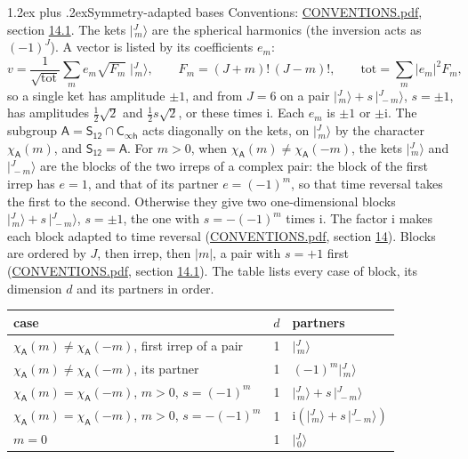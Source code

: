 \documentclass[10pt,a4paper]{article}
\makeatletter
\renewcommand\section{\@startsection{section}{1}{\z@}{-3ex plus -1ex minus -.2ex}%
  {1.2ex plus .2ex}{\normalfont\large\sffamily\bfseries\color{parttitle}}}
\numberwithin{equation}{section}
\newcommand{\grp}[1]{\mathsf{#1}}
\newcommand{\iunit}{\mathrm{i}}
\newcommand{\chiA}{\chi_{\grp{A}}}
\newcommand{\jm}[2]{\bigl\lvert{}^{#1}_{\,#2}\bigr\rangle}
\makeatother
\begin{document}
\section{Symmetry-adapted bases}\label{s:bases}
Conventions: \href{../../CONVENTIONS.pdf}{CONVENTIONS.pdf}, section \href{../../CONVENTIONS.pdf\#conv.14.1}{14.1}.
\leavevmode\label{n:index.m}\label{n:vector.ket}The kets $\jm{J}{m}$ are the spherical harmonics (the inversion acts as $(-1)^J$). \label{n:index.ketcoefficient}\label{n:vector.basis.symmetry}\label{n:index.ketweight}\label{n:index.total}A vector is listed by its coefficients $e_m$:
\begin{equation}\label{e:ket}v = \frac{1}{\sqrt{\mathrm{tot}}}\sum_m e_m\sqrt{F_m}\;\jm{J}{m},\qquad F_m = (J+m)!\,(J-m)!,\qquad \mathrm{tot} = \sum_m |e_m|^2F_m,\end{equation}
\leavevmode\label{n:index.pair.sign}so a single ket has amplitude $\pm1$, and from $J = 6$ on a pair $\jm{J}{m} + s\,\jm{J}{-m}$, $s = \pm1$, has amplitudes $\tfrac{1}{2}\sqrt{2}$ and $\tfrac{1}{2}s\sqrt{2}$, or these times $\iunit$. Each $e_m$ is $\pm1$ or $\pm\iunit$.
\leavevmode\label{n:group.A}\label{n:function.character.abelian}The subgroup $\grp{A} = \grp{S_{12}}\cap\grp{C_{\infty h}}$ acts diagonally on the kets, on $\jm{J}{m}$ by the character $\chiA(m)$, and $\grp{S_{12}} = \grp{A}$. For $m > 0$, when $\chiA(m) \ne \chiA(-m)$, the kets $\jm{J}{m}$ and $\jm{J}{-m}$ are the blocks of the two irreps of a complex pair: the block of the first irrep has $e = 1$, and that of its partner $e = (-1)^m$, so that time reversal takes the first to the second. Otherwise they give two one-dimensional blocks $\jm{J}{m} + s\,\jm{J}{-m}$, $s = \pm1$, the one with $s = -(-1)^m$ times $\iunit$. The factor $\iunit$ makes each block adapted to time reversal (\href{../../CONVENTIONS.pdf}{CONVENTIONS.pdf}, section \href{../../CONVENTIONS.pdf\#conv.14}{14}). Blocks are ordered by $J$, then irrep, then $|m|$, a pair with $s = +1$ first (\href{../../CONVENTIONS.pdf}{CONVENTIONS.pdf}, section \href{../../CONVENTIONS.pdf\#conv.14.1}{14.1}).
\leavevmode\label{n:head.case}\label{n:head.partners}The table lists every case of block, its dimension $d$ and its partners in order.
\begin{center}\begin{tabular}{@{}lrl@{}}\toprule
case & $d$ & partners\\\midrule
$\chiA(m) \ne \chiA(-m)$, first irrep of a pair & 1 & $\jm{J}{m}$\\
$\chiA(m) \ne \chiA(-m)$, its partner & 1 & $(-1)^m\jm{J}{m}$\\
$\chiA(m) = \chiA(-m)$, $m > 0$, $s = (-1)^m$ & 1 & $\jm{J}{m} + s\,\jm{J}{-m}$\\
$\chiA(m) = \chiA(-m)$, $m > 0$, $s = -(-1)^m$ & 1 & $\iunit(\jm{J}{m} + s\,\jm{J}{-m})$\\
$m = 0$ & 1 & $\jm{J}{0}$\\
\bottomrule\end{tabular}\end{center}
\end{document}
